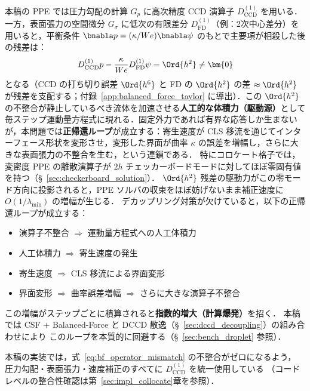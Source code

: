 本稿の PPE では圧力勾配の計算 $G_p$ に高次精度 CCD 演算子 $D^{(1)}_{\mathrm{CCD}}$ を用いる．一方，表面張力の空間微分 $G_\sigma$ に低次の有限差分 $D^{(1)}_{\mathrm{FD}}$（例：2次中心差分）を用いると，平衡条件 $\bnabla p = (\kappa/We)\bnabla\psi$ のもとで主要項が相殺した後の残差は：
\begin{equation}
  D^{(1)}_{\mathrm{CCD}} p - \frac{\kappa}{We} D^{(1)}_{\mathrm{FD}}\psi
  = \Ord{h^2} \neq \bm{0}
  \label{eq:bf_operator_mismatch}
\end{equation}
となる（CCD の打ち切り誤差 $\Ord{h^6}$ と FD の $\Ord{h^2}$ の差 $\approx \Ord{h^2}$ が残差を支配する；付録~\ref{app:balanced_force_taylor} に導出）．この $\Ord{h^2}$ の不整合が静止しているべき流体を加速させる\textbf{人工的な体積力（駆動源）}として毎ステップ運動量方程式に現れる．固定外力であれば有界な応答しか生まないが，本問題では\textbf{正帰還ループ}が成立する：寄生速度が CLS 移流を通じてインターフェース形状を変形させ，変形した界面が曲率 $\kappa$ の誤差を増幅し，さらに大きな表面張力の不整合を生む，という連鎖である．
特にコロケート格子では，変密度 PPE の離散演算子が $2h$ チェッカーボードモードに対してほぼ零固有値を持つ（§~\ref{sec:checkerboard_solution}）．
$\Ord{h^2}$ 残差の駆動力がこの零モード方向に投影されると，PPE ソルバの収束をほぼ妨げないまま補正速度に $O(1/\lambda_{\min})$ の増幅が生じる．
デカップリング対策が欠けていると，以下の正帰還ループが成立する：
\begin{itemize}
  \item 演算子不整合 $\Rightarrow$ 運動量方程式への人工体積力
  \item 人工体積力 $\Rightarrow$ 寄生速度の発生
  \item 寄生速度 $\Rightarrow$ CLS 移流による界面変形
  \item 界面変形 $\Rightarrow$ 曲率誤差増幅 $\Rightarrow$ さらに大きな演算子不整合
\end{itemize}
この増幅がステップごとに積算されると\textbf{指数的増大（計算爆発）}を招く．
本稿では CSF + Balanced-Force と DCCD 散逸（§~\ref{sec:dccd_decoupling}）の組み合わせにより
このループを本質的に回避する（§~\ref{sec:bench_droplet} 参照）．

本稿の実装では，式~\eqref{eq:bf_operator_mismatch} の不整合がゼロになるよう，
圧力勾配・表面張力・速度補正のすべてに $D^{(1)}_\mathrm{CCD}$ を統一使用している
（コードレベルの整合性確認は第~\ref{sec:impl_collocate}章を参照）．

